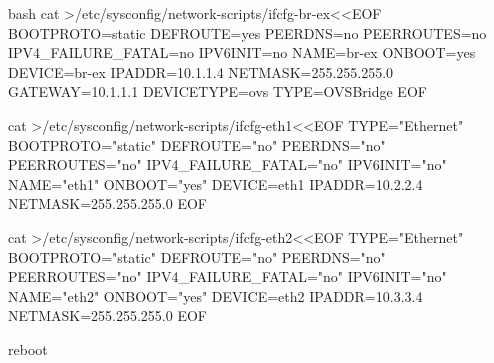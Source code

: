 \begin{outline}[enumerate]
\begin{code-in-enumerate}{bash}
cat >/etc/sysconfig/network-scripts/ifcfg-br-ex<<EOF
BOOTPROTO=static
DEFROUTE=yes
PEERDNS=no
PEERROUTES=no
IPV4_FAILURE_FATAL=no
IPV6INIT=no
NAME=br-ex
ONBOOT=yes
DEVICE=br-ex
IPADDR=10.1.1.4
NETMASK=255.255.255.0
GATEWAY=10.1.1.1
DEVICETYPE=ovs
TYPE=OVSBridge
EOF

cat >/etc/sysconfig/network-scripts/ifcfg-eth1<<EOF
TYPE="Ethernet"
BOOTPROTO="static"
DEFROUTE="no"
PEERDNS="no"
PEERROUTES="no"
IPV4_FAILURE_FATAL="no"
IPV6INIT="no"
NAME="eth1"
ONBOOT="yes"
DEVICE=eth1
IPADDR=10.2.2.4
NETMASK=255.255.255.0
EOF

cat >/etc/sysconfig/network-scripts/ifcfg-eth2<<EOF
TYPE="Ethernet"
BOOTPROTO="static"
DEFROUTE="no"
PEERDNS="no"
PEERROUTES="no"
IPV4_FAILURE_FATAL="no"
IPV6INIT="no"
NAME="eth2"
ONBOOT="yes"
DEVICE=eth2
IPADDR=10.3.3.4
NETMASK=255.255.255.0
EOF

reboot
\end{code-in-enumerate}

\end{outline}

